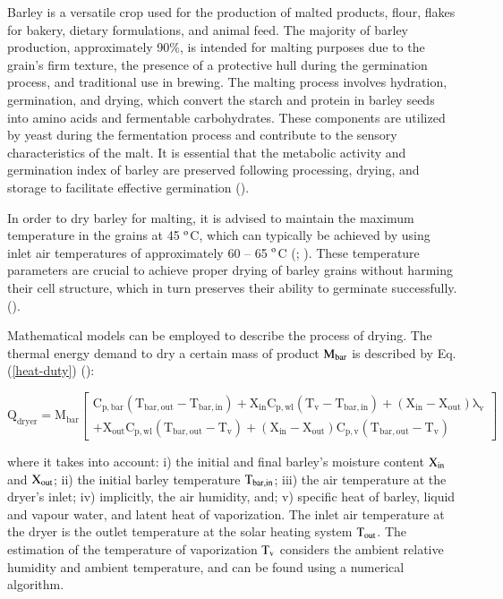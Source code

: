 Barley is a versatile crop used for the production of malted products, flour, flakes for bakery, dietary formulations, and animal feed. The majority of barley production, approximately 90\%, is intended for malting purposes due to the grain's firm texture, the presence of a protective hull during the germination process, and traditional use in brewing. The malting process involves hydration, germination, and drying, which convert the starch and protein in barley seeds into amino acids and fermentable carbohydrates. These components are utilized by yeast during the fermentation process and contribute to the sensory characteristics of the malt. It is essential that the metabolic activity and germination index of barley are preserved following processing, drying, and storage to facilitate effective germination (\cite{Soares2016}).

In order to dry barley for malting, it is advised to maintain the maximum temperature in the grains at 45 $^{\rm{o}}$C, which can typically be achieved by using inlet air temperatures of approximately 60 -- 65 $^{\rm{o}}$C (\cite{Embrapa2021}; \cite{Syngenta2020}). These temperature parameters are crucial to achieve proper drying of barley grains without harming their cell structure, which in turn preserves their ability to germinate successfully. (\cite{Soares2016}).

Mathematical models can be employed to describe the process of drying. The thermal energy demand to dry a certain mass of product $\rm{M_{bar}}$ is described by Eq. (\ref{heat-duty}) (\cite{McCabe1993}):

\vspace{-0.75cm}
\begin{equation}
	\mathrm{Q_{dryer} = M_{bar}}\left[
	\begin{array}{l} 
		\mathrm{C_{p,bar}(T_{bar,out} - T_{bar,in}) + X_{in}C_{p,wl}(T_v - T_{bar,in}) + (X_{in} - X_{out})\lambda_v } \\
		\mathrm{+ X_{out}C_{p,wl}(T_{bar,out} - T_v) + (X_{in} - X_{out})C_{p,v}(T_{bar,out} - T_v)   }
	\end{array} \right]
	\label{heat-duty}
\end{equation}

\noindent where it takes into account: i) the initial and final barley's moisture content $\rm{X_{in}}$ and $\rm{X_{out}}$; ii) the initial barley temperature $\rm{T_{bar,in}}$; iii) the air temperature at the dryer's inlet; iv) implicitly, the air humidity, and; v) specific heat of barley, liquid and vapour water, and latent heat of vaporization. The inlet air temperature at the dryer is the outlet temperature at the solar heating system $\rm{T_{out}}$. The estimation of the temperature of vaporization $\rm{T_v}$ considers the ambient relative humidity and ambient temperature, and can be found using a numerical algorithm.

